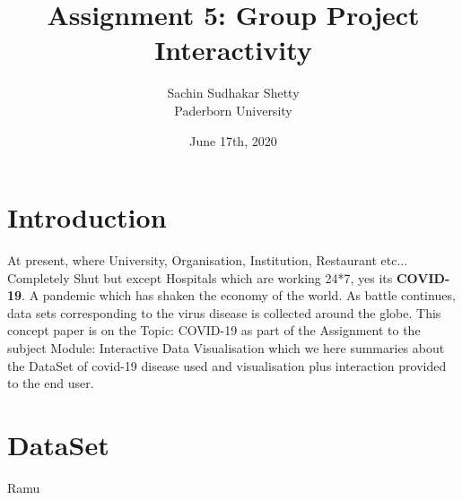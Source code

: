 \documentclass[10pt]{article}
\newcommand{\participant}{Sachin Sudhakar Shetty}
\newcommand{\affiliation}{Paderborn University}
\newcommand{\topic}{Assignment 5: Group Project Interactivity}
\newcommand{\submissiondate}{June 17th, 2020}
\begin{document}
\title{\topic}
\author{\Large{\participant}\\ \affiliation \\ {\small \emailaddress}}
\date{\submissiondate}
\maketitle
\thispagestyle{empty}




\section{Introduction}

\color{black}
At present, where University, Organisation, Institution, Restaurant etc... Completely Shut but except Hospitals which are working 24*7, yes its {\bf COVID-19}. A pandemic which has shaken the economy of the world. As battle continues, data sets corresponding to the virus disease is collected around the globe. This concept  paper is on the Topic: COVID-19 as part of the Assignment  to the subject Module: Interactive Data Visualisation which we here summaries about the DataSet of covid-19 disease used and visualisation plus interaction provided to the end user.	
\color{black}

\section{DataSet}
Ramu
\end{document}
